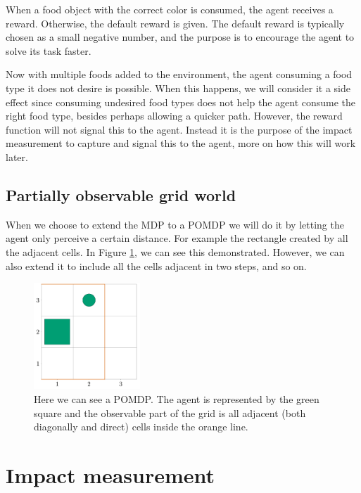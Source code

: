 \documentclass[12pt,A4]{report}
\theoremstyle{definition}
\begin{document}
When a food object with the correct color is consumed, the agent receives a reward. Otherwise, the default reward is given. The default reward is typically chosen as a small negative number, and the purpose is to encourage the agent to solve its task faster.

Now with multiple foods added to the environment, the agent consuming a food type it does not desire is possible. When this happens, we will consider it a side effect since consuming undesired food types does not help the agent consume the right food type, besides perhaps allowing a quicker path. However, the reward function will not signal this to the agent. Instead it is the purpose of the impact measurement to capture and signal this to the agent, more on how this will work later.

\subsection{Partially observable grid world}
When we choose to extend the MDP to a POMDP we will do it by letting the agent only perceive a certain distance. For example the rectangle created by all the adjacent cells. In Figure \ref{fig:redline}, we can see this demonstrated. However, we can also extend it to include all the cells adjacent in two steps, and so on. 

\begin{figure}[H]
  \centering
  \includegraphics[width=4cm]{"./figures/s2_redline.png"}
  \caption{Here we can see a POMDP. The agent is represented by the green square and the observable part of the grid is all adjacent (both diagonally and direct) cells inside the orange line. }
  \label{fig:redline}
\end{figure}

\section{Impact measurement}

\end{document}
